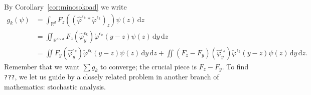 By Corollary~\ref{cor:minosokoad} we write
\begin{align*}
    g_k(\psi) &= \int_{\mathbb{R}^d} F_z({(\hat \varphi^{\epsilon_k} * \check \varphi^{\epsilon_k})}_z) \psi(z)\, \mathrm{d}z \\
    &= \iint_{\mathbb{R}^{d \times d}} F_z(\hat \varphi^{\epsilon_k}_y) \check \varphi^{\epsilon_k}(y-z) \psi(z) \, \mathrm{d}y\, \mathrm{d}z \\
    &= \iint F_y(\hat \varphi^{\epsilon_k}_y) \check \varphi^{\epsilon_k}(y-z) \psi(z) \, \mathrm{d}y\, \mathrm{d}z 
    + \iint (F_z - F_y)(\hat \varphi^{\epsilon_k}_y) \check \varphi^{\epsilon_k}(y-z) \psi(z) \, \mathrm{d}y\, \mathrm{d}z.
\end{align*}
Remember that we want \(\sum g_k\) to converge; the crucial piece is \( F_z - F_y \). To find \texttt{???}, we let us guide by a closely related problem in another branch of mathematics: stochastic analysis. 

